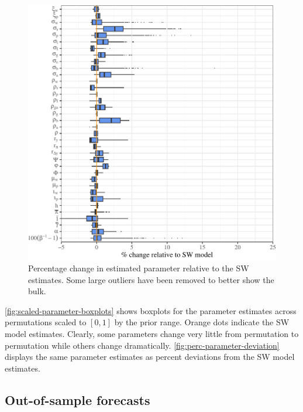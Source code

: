 \documentclass[11pt]{article}
\begin{document}
\begin{figure}[t]

{\centering \includegraphics{gfx/perc-parameter-deviation-1} 

}

\caption{Percentage change in estimated parameter relative to the SW estimates. Some large outliers have been removed to better show the bulk.}\label{fig:perc-parameter-deviation}
\end{figure}

\autoref{fig:scaled-parameter-boxplots} shows boxplots for the parameter
estimates across permutations scaled to \([0,1]\) by the prior range.
Orange dots indicate the SW model estimates. Clearly, some parameters
change very little from permutation to permutation while others change
dramatically. \autoref{fig:perc-parameter-deviation} displays the same
parameter estimates as percent deviations from the SW model estimates.

\hypertarget{out-of-sample-forecasts}{%
\subsection{Out-of-sample forecasts}\label{out-of-sample-forecasts}}
\end{document}
